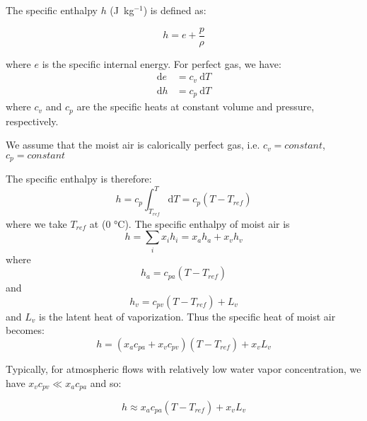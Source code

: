 The specific enthalpy $h$ (J~kg$^{-1}$) is defined as:

\begin{equation}
h = e + \frac{p}{\rho}
\end{equation}

where $e$ is the specific internal energy. For perfect gas, we have:
\begin{align}
\mathrm{d}e &= c_v ~\mathrm{d}T\\
\mathrm{d}h &= c_p ~\mathrm{d}T
\end{align}
where $c_v$ and $c_p$ are the specific heats at constant volume and pressure, respectively.
\begin{assumption}
	We assume that the moist air is calorically perfect gas, i.e. $c_v=\textit{constant}$, $c_p=\textit{constant}$
\end{assumption}
The specific enthalpy is therefore:
\begin{equation}
h = c_p \int^T_{T_{\textit{ref}}} \mathrm{d}T = c_p \left(T - T_{\textit{ref}}\right)
\end{equation}
where we take $T_{ref}$ at (0 \si{\degreeCelsius}). The specific enthalpy of moist air is 
\begin{equation}
h = \sum_i x_i h_i = x_a h_a + x_v h_v
\end{equation}
where
\begin{equation}
h_a = c_{pa} \left(T - T_{\textit{ref}}\right)
\end{equation}
and 
\begin{equation}
h_v = c_{pv} \left(  T - T_{\textit{ref}}\right) + L_v
\end{equation}
and $L_v$ is the latent heat of vaporization. Thus the specific heat of moist air becomes:
\begin{equation}
h = \left(x_a c_{pa} + x_v c_{pv} \right) \left(T - T_{\textit{ref}}\right)  + x_v L_v
\end{equation}

Typically, for atmospheric flows with relatively low water vapor concentration, we have $x_v c_{pv} \ll x_a c_{pa}$ and so: 

\begin{equation}
h \approx x_a c_{pa} \left(T - T_{\textit{ref}}\right)  + x_v L_v
\end{equation}

